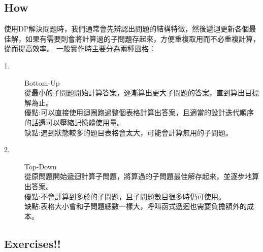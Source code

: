 \documentclass{article}
\begin{document}
\subsection{How}
使用DP解決問題時，我們通常會先辨認出問題的結構特徵，然後遞迴更新各個最佳解，如果有需要則會將計算過的子問題存起來，方便重複取用而不必重複計算，從而提高效率。 
一般實作時主要分為兩種風格：
\begin{description}
\item[ 1.]Bottom-Up\\
從最小的子問題開始計算答案，逐漸算出更大子問題的答案，直到算出目標解為止。\\
優點:可以直接使用迴圈跑過整個表格計算出答案，且適當的設計迭代順序的話還可以壓縮記憶體使用量。\\
缺點:遇到狀態較多的題目表格會太大，可能會計算無用的子問題。
\item[ 2.]Top-Down\\
從原問題開始遞迴計算子問題，將算過的子問題最佳解存起來，並逐步地算出答案。\\
優點:不會計算到多於的子問題，且子問題數目很多時仍可使用。\\
缺點:表格大小會和子問題總數一樣大，呼叫函式遞迴也需要負擔額外的成本。
\end{description} 


\subsection{Exercises!!}
\end{document}
